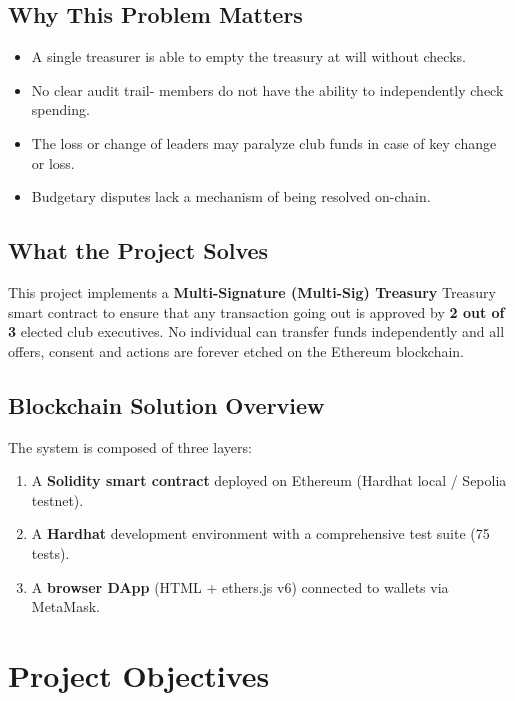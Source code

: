 \documentclass[12pt,a4paper]{article}
\begin{document}
\subsection{Why This Problem Matters}

\begin{itemize}
  \item A single treasurer is able to empty the treasury at will without checks.
  \item No clear audit trail- members do not have the ability to independently check spending.
  \item The loss or change of leaders may paralyze club funds in case of key change or loss.
  \item Budgetary disputes lack a mechanism of being resolved on-chain.
\end{itemize}

\subsection{What the Project Solves}

This project implements a \textbf{Multi-Signature (Multi-Sig) Treasury} Treasury smart contract to ensure that any transaction going out is approved by \textbf{2 out of 3} elected club executives. No individual can transfer funds independently and all offers, consent and actions are forever etched on the Ethereum blockchain.
\subsection{Blockchain Solution Overview}

The system is composed of three layers:
\begin{enumerate}
  \item A \textbf{Solidity smart contract} deployed on Ethereum (Hardhat local / Sepolia testnet).
  \item A \textbf{Hardhat} development environment with a comprehensive test suite (75 tests).
  \item A \textbf{browser DApp} (HTML + ethers.js v6) connected to wallets via MetaMask.
\end{enumerate}

\section{Project Objectives}
\end{document}
